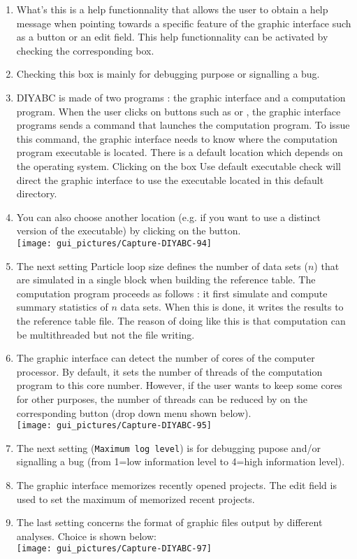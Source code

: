 \begin{enumerate}
\item \textsf{What's this} is a help functionnality that allows the user
to obtain a help message when pointing towards a specific feature
of the graphic interface such as a button or an edit field. This help
functionnality can be activated by checking the corresponding box.
\item Checking this box is mainly for debugging purpose or signalling a
bug.
\item DIYABC is made of two programs : the graphic interface and a computation
program. When the user clicks on buttons such as  or , the graphic interface
programs sends a command that launches the computation program. To
issue this command, the graphic interface needs to know where the
computation program executable is located. There is a default location
which depends on the operating system. Clicking on the box \textsf{Use
default executable check} will direct the graphic interface to use
the executable located in this default directory.
\item You can also choose another location (e.g. if you want to use a distinct
version of the executable) by clicking on the 
button.\\
 \texttt{[image: gui\_pictures/Capture-DIYABC-94]} \\

\item The next setting \textsf{Particle loop size} defines the number of
data sets ($n$) that are simulated in a single block when building
the reference table. The computation program proceeds as follows :
it first simulate and compute summary statistics of $n$ data sets.
When this is done, it writes the results to the reference table file.
The reason of doing like this is that computation can be multithreaded
but not the file writing.
\item The graphic interface can detect the number of cores of the computer
processor. By default, it sets the number of threads of the computation
program to this core number. However, if the user wants to keep some
cores for other purposes, the number of threads can be reduced by
on the corresponding button (drop down menu shown below).\\
 \texttt{[image: gui\_pictures/Capture-DIYABC-95]} \\

\item The next setting (\texttt{Maximum log level}) is for debugging pupose
and/or signalling a bug (from 1=low information level to 4=high information
level).
\item The graphic interface memorizes recently opened projects. The edit
field is used to set the maximum of memorized recent projects.
\item The last setting concerns the format of graphic files output by different
analyses. Choice is shown below:\\
 \texttt{[image: gui\_pictures/Capture-DIYABC-97]} \\

\end{enumerate}
